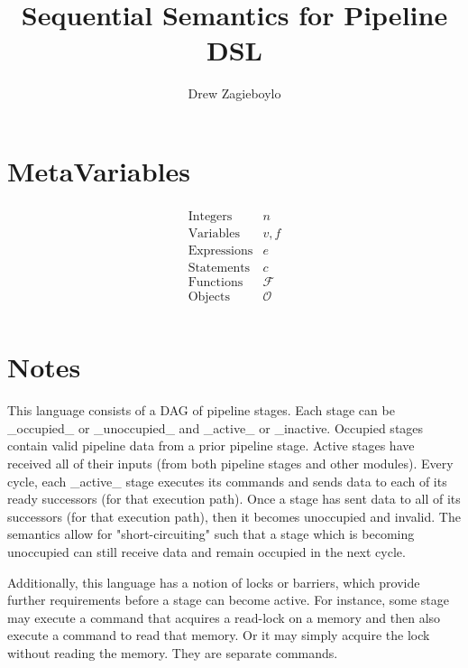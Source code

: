 \documentclass{article}
\begin{document}
\title{Sequential Semantics for Pipeline DSL}
\author{Drew Zagieboylo}
\maketitle

\section{MetaVariables}
\begin{align*}
  \begin{array}{lc}
    \mbox{Integers} & n \\
    \mbox{Variables} & v,f\\
    \mbox{Expressions} & e\\
    \mbox{Statements} & c\\
    \mbox{Functions} & \mathcal{F}\\
    \mbox{Objects} & \mathcal{O}\\
  \end{array}
\end{align*}

\section{Notes}

This language consists of a DAG of pipeline stages.
Each stage can be _occupied_ or _unoccupied_ and _active_ or _inactive.
Occupied stages contain valid pipeline data from a prior
pipeline stage.
Active stages have received all of their inputs (from both
pipeline stages and other modules).
Every cycle, each _active_ stage executes its commands
and sends data to each of its ready successors (for that execution path).
Once a stage has sent data to all of its successors (for that execution path),
then it becomes unoccupied and invalid.
The semantics allow for "short-circuiting" such that a stage which is
becoming unoccupied can still receive data and remain occupied in the next cycle.

Additionally, this language has a notion of locks or barriers,
which provide further requirements before a stage can become active.
For instance, some stage may execute a command that acquires a read-lock
on a memory and then also execute a command to read that memory. Or it may
simply acquire the lock without reading the memory. They are separate commands.
\end{document}
